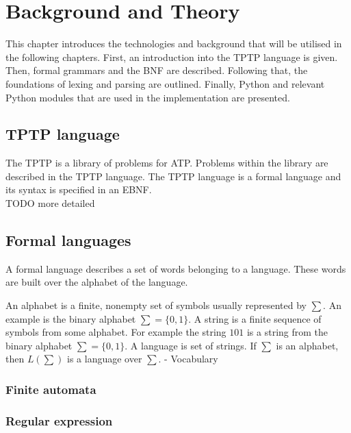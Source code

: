 
\chapter{Background and Theory}\label{cha:Background}
This chapter introduces the technologies and background that will be utilised in the following chapters. First, an introduction into the \ac{TPTP} language is given. Then, formal grammars and the \ac{BNF} are described. Following that, the foundations of lexing and parsing are outlined. Finally, Python and relevant Python modules that are used in the implementation are presented.

\section{TPTP language}\label{sec:BackgroundTPTP}
The \acf{TPTP} is a library of problems for \ac{ATP}.
Problems within the library are described in the \ac{TPTP} language.
The  \ac{TPTP} language is a formal language and its syntax is specified in an \ac{EBNF}. \cite{Sut17}\\

TODO more detailed

\section{Formal languages}\label{sec:BackgroundFormalLanguage}

A formal language describes a set of words belonging to a language. These words are built over the alphabet of the language.

An alphabet is a finite, nonempty set of symbols usually represented by $\sum$. An example is the binary alphabet $\sum = \{0,1\}$.
A string is a finite sequence of symbols from some alphabet. For example the string $101$ is a string from the binary alphabet $\sum = \{0,1\}$.
A language is set of strings. If $\sum$ is an alphabet, then    $L(\sum)$ is a language over $\sum$. \cite{AutomataTheory.2007}
- Vocabulary


\subsection{Finite automata}\label{sec:BackgroundAutomata}

\subsection{Regular expression}\label{sec:BackgroundRegEx}

